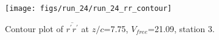 \begin{figure}[H]
\centering
\texttt{[image: figs/run\_24/run\_24\_rr\_contour]}
\caption{Contour plot of $\overline{r^\prime r^\prime}$ at $z/c$=7.75, $V_{free}$=21.09, station 3.}
\label{fig:run_24_rr_contour}
\end{figure}



